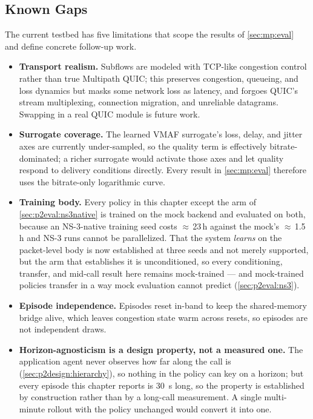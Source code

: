 \subsection{Known Gaps}
\label{sec:p2impl:gaps}

The current testbed has five limitations that scope the results of \cref{sec:mp:eval} and define concrete
follow-up work.

\begin{itemize}
  \item \textbf{Transport realism.} Subflows are modeled with TCP-like congestion control rather than true
  Multipath QUIC; this preserves congestion, queueing, and loss dynamics but masks some network loss as
  latency, and forgoes QUIC's stream multiplexing, connection migration, and unreliable datagrams.
  Swapping in a real QUIC module is future work.
  \item \textbf{Surrogate coverage.} The learned VMAF surrogate's loss, delay, and jitter axes are
  currently under-sampled, so the quality term is effectively bitrate-dominated; a richer surrogate would
  activate those axes and let quality respond to delivery conditions directly. Every result in
  \cref{sec:mp:eval} therefore uses the bitrate-only logarithmic curve.
  \item \textbf{Training body.} Every policy in this chapter except the arm of
  \cref{sec:p2eval:ns3native} is trained on the mock backend and evaluated on both, because an
  NS-3-native training seed costs ${\approx}$\,23\,h against the mock's ${\approx}$\,1.5\,h and NS-3 runs
  cannot be parallelized. That the system \emph{learns} on the packet-level body is now established at
  three seeds and not merely supported, but the arm that establishes it is unconditioned, so every
  conditioning, transfer, and mid-call result here remains mock-trained --- and mock-trained policies
  transfer in a way mock evaluation cannot predict (\cref{sec:p2eval:ns3}).
  \item \textbf{Episode independence.} Episodes reset in-band to keep the shared-memory bridge alive,
  which leaves congestion state warm across resets, so episodes are not independent draws.
  \item \textbf{Horizon-agnosticism is a design property, not a measured one.} The application agent
  never observes how far along the call is (\cref{sec:p2design:hierarchy}), so nothing in the policy can
  key on a horizon; but every episode this chapter reports is \SI{30}{\second} long, so the property is
  established by construction rather than by a long-call measurement. A single multi-minute rollout with
  the policy unchanged would convert it into one.
\end{itemize}


